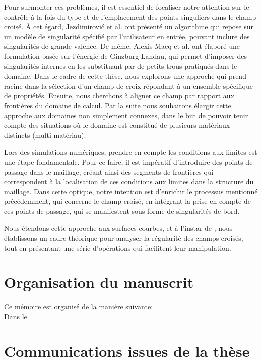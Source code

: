 Pour surmonter ces problèmes, il est essentiel de focaliser notre attention sur le contrôle à la fois du type et de l'emplacement des points singuliers dans le champ croisé. À cet égard, Jezdimirović et al. \cite{jezdimirovic2021quad} ont présenté un algorithme qui repose sur un modèle de singularité spécifié par l'utilisateur en entrée, pouvant inclure des singularités de grande valence. De même, Alexis Macq et al. \cite{macq2020ginzburg} ont élaboré une formulation basée sur l'énergie de Ginzburg-Landau, qui permet d'imposer des singularités internes en les substituant par de petits trous pratiqués dans le domaine. Dans le cadre de cette thèse, nous explorons une approche qui prend racine dans la sélection d'un champ de croix répondant à un ensemble spécifique de propriétés. Ensuite, nous cherchons à aligner ce champ par rapport aux frontières du domaine de calcul. Par la suite nous souhaitons élargir cette approche aux domaines non simplement connexes, dans le but de pouvoir tenir compte des situations où le domaine est constitué de plusieurs matériaux distincts (multi-matériau).

Lors des simulations numériques, prendre en compte les conditions aux limites est une étape fondamentale. Pour ce faire, il est impératif d'introduire des points de passage dans le maillage, créant ainsi des segments de frontières qui correspondent à la localisation de ces conditions aux limites dans la structure du maillage. Dans cette optique, notre intention est d'enrichir le processus mentionné précédemment, qui concerne le champ croisé, en intégrant la prise en compte de ces points de passage, qui se manifestent sous forme de singularités de bord.

Nous étendons cette approche aux surfaces courbes, et à l'instar de \cite{viertel2019approach}, nous établissons un cadre théorique pour analyser la régularité des champs croisés, tout en présentant une série d'opérations qui facilitent leur manipulation.

\section{Organisation du manuscrit}

 Ce mémoire est organisé de la manière suivante:\\

 Dans le \textbf{\color{blue!50!black}{Chapitre 1}}

\newpage
\section{Communications issues de la thèse}

